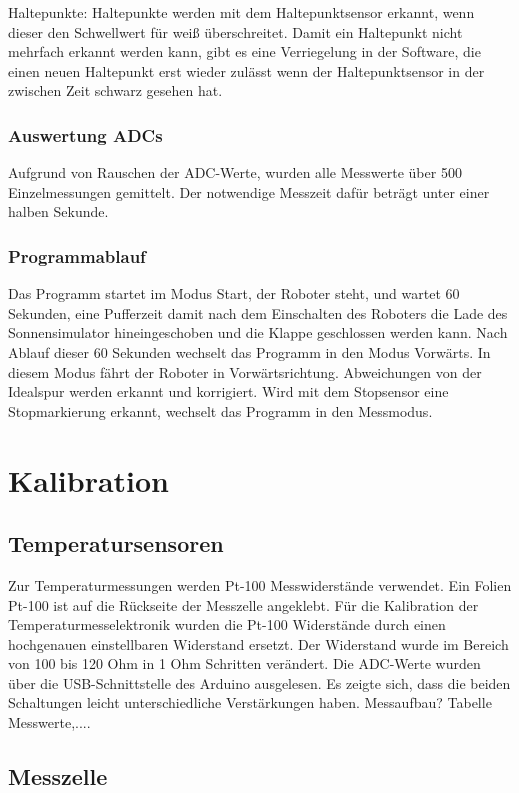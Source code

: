 \documentclass[a4paper,bibtotoc,oneside]{scrbook}
\begin{document}
Haltepunkte: Haltepunkte werden mit dem Haltepunktsensor erkannt, wenn dieser den Schwellwert für weiß überschreitet. Damit ein Haltepunkt nicht mehrfach erkannt werden kann, gibt es eine Verriegelung in der Software, die einen neuen Haltepunkt erst wieder zulässt wenn der Haltepunktsensor in der zwischen Zeit schwarz gesehen hat.



\subsection{Auswertung ADCs}\thispagestyle{empty}
Aufgrund von Rauschen der ADC-Werte, wurden alle Messwerte über 500 Einzelmessungen gemittelt. Der notwendige Messzeit dafür beträgt unter einer halben Sekunde. 

\subsection{Programmablauf}\thispagestyle{empty}
Das Programm startet im Modus Start, der Roboter steht, und wartet 60 Sekunden, eine Pufferzeit damit nach dem Einschalten des Roboters die Lade des Sonnensimulator hineingeschoben und die Klappe geschlossen werden kann.
Nach Ablauf dieser 60 Sekunden wechselt das Programm in den Modus Vorwärts. In diesem Modus fährt der Roboter in Vorwärtsrichtung. Abweichungen von der Idealspur werden erkannt und korrigiert. Wird mit dem Stopsensor eine Stopmarkierung erkannt, wechselt das Programm in den Messmodus. 

\chapter{Kalibration}\thispagestyle{empty}
\section{Temperatursensoren}\thispagestyle{empty}
Zur Temperaturmessungen werden Pt-100 Messwiderstände verwendet. Ein Folien Pt-100 ist auf die Rückseite der Messzelle angeklebt. 
Für die Kalibration der Temperaturmesselektronik wurden die Pt-100 Widerstände durch einen hochgenauen einstellbaren Widerstand ersetzt. Der Widerstand wurde im Bereich von 100 bis 120 Ohm in 1 Ohm Schritten verändert. Die ADC-Werte wurden über die USB-Schnittstelle des Arduino ausgelesen. Es zeigte sich, dass die beiden Schaltungen leicht unterschiedliche Verstärkungen haben.
Messaufbau? Tabelle Messwerte,....

\section{Messzelle}\thispagestyle{empty}
\end{document}

